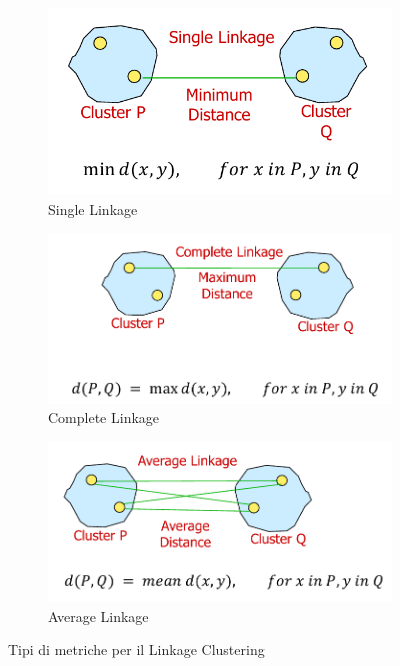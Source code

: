 \begin{figure}[h]
\centering
\begin{subfigure}[b]{0.8\textwidth}
\centering
\includegraphics[width=\textwidth]{img/single-linkage.png}
\caption{Single Linkage}\label{img:single-linkage}
\end{subfigure}

\hfill

\begin{subfigure}[b]{0.8\textwidth}
\centering
\includegraphics[width=\textwidth]{img/complete-linkage.png}
\caption{Complete Linkage}\label{img:complete-linkage}
\end{subfigure}

\hfill
\begin{subfigure}[b]{0.8\textwidth}
\centering
\includegraphics[width=\textwidth]{img/average-linkage.png}
\caption{Average Linkage}\label{img:average-linkage}
\end{subfigure}

\caption{Tipi di metriche per il Linkage Clustering}
\end{figure}

